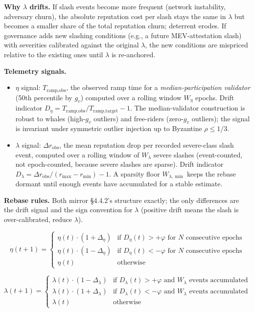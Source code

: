 \documentclass[
  11pt,
]{article}
\providecommand{\tightlist}{%
  \setlength{\itemsep}{0pt}\setlength{\parskip}{0pt}}
\begin{document}
\textbf{Why $\lambda$ drifts.} If slash events become more frequent
(network instability, adversary churn), the absolute reputation cost per
slash stays the same in \(\lambda\) but becomes a smaller share of the
total reputation churn; deterrent erodes. If governance adds new
slashing conditions (e.g., a future MEV-attestation slash) with
severities calibrated against the original \(\lambda\), the new
conditions are mispriced relative to the existing ones until \(\lambda\)
is re-anchored.

\textbf{Telemetry signals.}

\begin{itemize}
\tightlist
\item
  \(\eta\) signal: \(T_{\text{ramp,obs}}\), the observed ramp time for a
  \emph{median-participation validator} (50th percentile by \(g_v\))
  computed over a rolling window \(W_\eta\) epochs. Drift indicator
  \(D_\eta = T_{\text{ramp,obs}} / T_{\text{ramp,target}} - 1\). The
  median-validator construction is robust to whales (high-\(g_v\)
  outliers) and free-riders (zero-\(g_v\) outliers); the signal is
  invariant under symmetric outlier injection up to Byzantine
  \(\rho \leq 1/3\).
\item
  \(\lambda\) signal: \(\Delta r_{\text{obs}}\), the mean reputation
  drop per recorded severe-class slash event, computed over a rolling
  window of \(W_\lambda\) severe slashes (event-counted, not
  epoch-counted, because severe slashes are sparse). Drift indicator
  \(D_\lambda = \Delta r_{\text{obs}} / (r_{\max} - r_{\min}) - 1\). A
  sparsity floor \(W_{\lambda,\min}\) keeps the rebase dormant until
  enough events have accumulated for a stable estimate.
\end{itemize}

\textbf{Rebase rules.} Both mirror §4.4.2's structure exactly; the only
differences are the drift signal and the sign convention for \(\lambda\)
(positive drift means the slash is over-calibrated, reduce \(\lambda\)).

\[\eta(t+1) = \begin{cases}
\eta(t) \cdot (1 + \Delta_\eta) & \text{if } D_\eta(t) > +\varphi \text{ for } N \text{ consecutive epochs} \\
\eta(t) \cdot (1 - \Delta_\eta) & \text{if } D_\eta(t) < -\varphi \text{ for } N \text{ consecutive epochs} \\
\eta(t) & \text{otherwise}
\end{cases}\]

\[\lambda(t+1) = \begin{cases}
\lambda(t) \cdot (1 - \Delta_\lambda) & \text{if } D_\lambda(t) > +\varphi \text{ and } W_\lambda \text{ events accumulated} \\
\lambda(t) \cdot (1 + \Delta_\lambda) & \text{if } D_\lambda(t) < -\varphi \text{ and } W_\lambda \text{ events accumulated} \\
\lambda(t) & \text{otherwise}
\end{cases}\]
\end{document}
